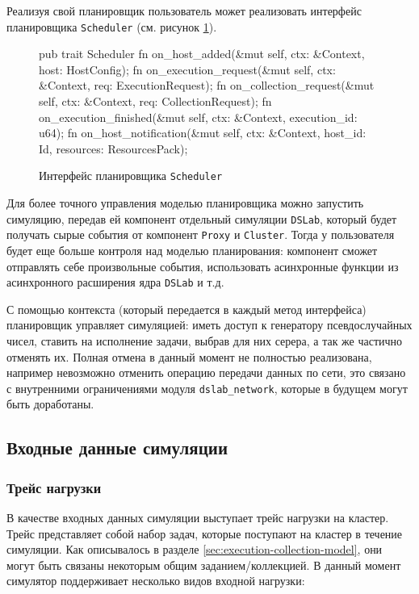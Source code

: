 Реализуя свой планировщик пользователь может реализовать интерфейс планировщика \texttt{Scheduler} (см. рисунок \ref{fig:scheduler-interface}). 

\begin{figure}[h!]
    \footnotesize
    \begin{rustcode}
pub trait Scheduler {
  fn on_host_added(&mut self, ctx: &Context, host: HostConfig);
  fn on_execution_request(&mut self, ctx: &Context, req: ExecutionRequest);
  fn on_collection_request(&mut self, ctx: &Context, req: CollectionRequest);
  fn on_execution_finished(&mut self, ctx: &Context, execution_id: u64);
  fn on_host_notification(&mut self, ctx: &Context, host_id: Id, resources: ResourcesPack);
}
    \end{rustcode}
    \caption{Интерфейс планировщика \texttt{Scheduler}}
    \label{fig:scheduler-interface}
\end{figure}

Для более точного управления моделью планировщика можно запустить симуляцию, передав ей компонент отдельный симуляции \texttt{DSLab}, который будет получать сырые события от компонент \texttt{Proxy} и \texttt{Cluster}. Тогда у пользователя будет еще больше контроля над моделью планирования: компонент сможет отправлять себе произвольные события, использовать асинхронные функции из асинхронного расширения ядра \texttt{DSLab} и т.д.

С помощью контекста (который передается в каждый метод интерфейса) планировщик управляет симуляцией: иметь доступ к генератору псевдослучайных чисел, ставить на исполнение задачи, выбрав для них серера, а так же частично отменять их. Полная отмена в данный момент не полностью реализована, например невозможно отменить операцию передачи данных по сети, это связано с внутренними ограничениями  модуля \texttt{dslab\_network}, которые в будущем могут быть доработаны.

\subsection{Входные данные симуляции}

\subsubsection{Трейс нагрузки}\label{sec:input-format-trace}

В качестве входных данных симуляции выступает трейс нагрузки на кластер. Трейс представляет собой набор задач, которые поступают на кластер в течение симуляции. Как описывалось в разделе \ref{sec:execution-collection-model}, они могут быть связаны некоторым общим заданием/коллекцией. В данный момент симулятор поддерживает несколько видов входной нагрузки: 

